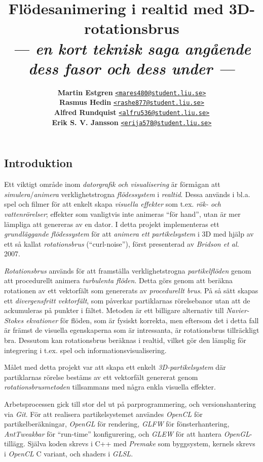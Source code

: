 \documentclass[a4paper]{article}
\date{\vspace{-0.5ex}} %
\title{\vspace{-2.2cm}\textbf{Flödesanimering i realtid med 3D-rotationsbrus}\\
       \Large{\textit{--- en kort teknisk saga angående dess fasor och dess under ---}}\vspace{-0.25cm}}
\author{{\textbf{Martin Estgren}}\;\;\;\;\;\; {\href{mailto:mares480@student.liu.se}{\texttt{<mares480@student.liu.se>}}}\\
        {\textbf{Rasmus Hedin}}\;\;\;\;\;\;\;\; {\href{mailto:rashe877@student.liu.se}{\texttt{<rashe877@student.liu.se>}}}\\
        {\textbf{Alfred Rundquist}}\;\;\; {\href{mailto:alfru536@student.liu.se}{\texttt{<alfru536@student.liu.se>}}}\\
        {\textbf{Erik S. V. Jansson}}\; {\href{mailto:erija578@student.liu.se}{\texttt{<erija578@student.liu.se>}}}}
\begin{document}
    \maketitle
\begin{multicols}{2}

    \section{Introduktion}

    Ett viktigt område inom \emph{datorgrafik och visualisering} är förmågan att \emph{simulera}/\emph{animera} verklighetstrogna \emph{flödessystem} i \emph{realtid}. Dessa används i bl.a. spel och filmer för att enkelt skapa \emph{visuella effekter} som t.ex. \emph{rök- och vattenrörelser}; effekter som vanligtvis inte animeras ``för hand'', utan är mer lämpliga att genereras av en dator. I detta projekt implementeras ett \emph{grundläggande flödessystem} för att \emph{animera ett partikelsystem} i 3D med hjälp av ett så kallat \emph{rotationsbrus} (``curl-noise''), först presenterad av \emph{Bridson et al.}~\cite{bridson2007curl} 2007.

    \textit{Rotationsbrus} används för att framställa verklighetstrogna \emph{partikelflöden} genom att procedurellt animera \emph{turbulenta flöden}. Detta görs genom att beräkna rotationen av ett vektorfält som genererats av \emph{procedurellt brus}. På så sätt skapas ett \emph{divergensfritt vektorfält}, som påverkar partiklarnas rörelsebanor utan att de ackumuleras på punkter i fältet. Metoden är ett billigare alternativ till \emph{Navier-Stokes ekvationer} för flöden, som är fysiskt korrekta, men eftersom det i detta fall är främst de visuella egenskaperna som är intressanta, är rotationsbrus tillräckligt bra. Dessutom kan rotationsbrus beräknas i realtid, vilket gör den lämplig för integrering i t.ex. spel och informationsvisualisering.

    Målet med detta projekt var att skapa ett enkelt \emph{3D-partikelsystem} där partiklarnas rörelse bestäms av ett vektorfält genererat genom \emph{rotationsbrusmetoden} tillsammans med några enkla visuella effekter.

    Arbetsprocessen gick till stor del ut på parprogrammering, och versionshantering via \textit{Git}. För att realisera partikelsystemet användes \textit{OpenCL} för partikelberäkningar, \textit{OpenGL} för rendering, \textit{GLFW} för fönsterhantering, \textit{AntTweakbar} för ``run-time'' konfigurering, och \textit{GLEW} för att hantera \textit{OpenGL}-tillägg. Själva koden skrevs i C++ med \emph{Premake} som byggsystem, kernels skrevs i \textit{OpenCL} C variant, och shaders i \textit{GLSL}.


\end{multicols}
\end{document}
